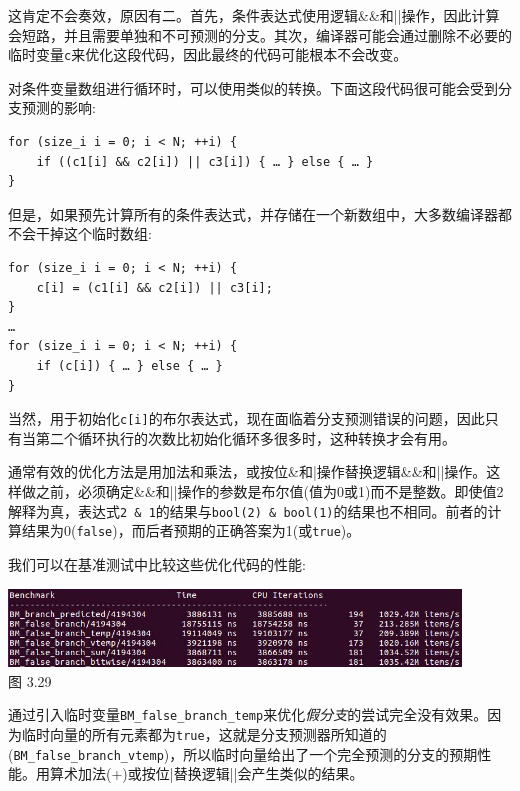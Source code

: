 这肯定不会奏效，原因有二。首先，条件表达式使用逻辑\&\&和||操作，因此计算会短路，并且需要单独和不可预测的分支。其次，编译器可能会通过删除不必要的临时变量\texttt{c}来优化这段代码，因此最终的代码可能根本不会改变。

对条件变量数组进行循环时，可以使用类似的转换。下面这段代码很可能会受到分支预测的影响:

\begin{lstlisting}[style=styleCXX]
for (size_i i = 0; i < N; ++i) {
	if ((c1[i] && c2[i]) || c3[i]) { … } else { … }
}
\end{lstlisting}

但是，如果预先计算所有的条件表达式，并存储在一个新数组中，大多数编译器都不会干掉这个临时数组:

\begin{lstlisting}[style=styleCXX]
for (size_i i = 0; i < N; ++i) {
	c[i] = (c1[i] && c2[i]) || c3[i];
}
…
for (size_i i = 0; i < N; ++i) {
	if (c[i]) { … } else { … }
}
\end{lstlisting}

当然，用于初始化\texttt{c[i]}的布尔表达式，现在面临着分支预测错误的问题，因此只有当第二个循环执行的次数比初始化循环多很多时，这种转换才会有用。

通常有效的优化方法是用加法和乘法，或按位\&和|操作替换逻辑\&\&和||操作。这样做之前，必须确定\&\&和||操作的参数是布尔值(值为0或1)而不是整数。即使值2解释为真，表达式\texttt{2 \& 1}的结果与\texttt{bool(2) \& bool(1)}的结果也不相同。前者的计算结果为0(\texttt{false})，而后者预期的正确答案为1(或\texttt{true})。

我们可以在基准测试中比较这些优化代码的性能:

\begin{center}
\includegraphics[width=0.9\textwidth]{content/1/chapter3/images/29.jpg}\\
图 3.29
\end{center}

通过引入临时变量\texttt{BM\_false\_branch\_temp}来优化\textit{假分支}的尝试完全没有效果。因为临时向量的所有元素都为\texttt{true}，这就是分支预测器所知道的(\texttt{BM\_false\_branch\_vtemp})，所以临时向量给出了一个完全预测的分支的预期性能。用算术加法(+)或按位|替换逻辑||会产生类似的结果。

